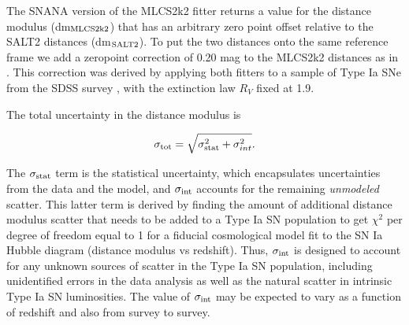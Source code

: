 The SNANA version of the MLCS2k2 fitter returns a value for the
distance modulus (dm$_{\rm MLCS2k2}$) that has an arbitrary zero point
offset relative to the SALT2 distances (dm$_{\rm SALT2}$).  To put the
two distances onto the same reference frame we add a zeropoint
correction of 0.20 mag to the MLCS2k2 distances as
in \citealt{Patel:2014}.  This correction was derived by applying both
fitters to a sample of Type Ia SNe from the SDSS
survey \citep{Holtzman:2008,Kessler:2009b}, with the extinction law
$R_V$ fixed at 1.9.

The total uncertainty in the distance modulus is  

\begin{equation} \label{eqn:sigmatot}
 \sigma_{\rm tot} = \sqrt{ \sigma_{\rm stat}^2 + \sigma_{int}^2}.
\end{equation}

\noindent
The $\sigma_{\rm stat}$ term is the statistical uncertainty, which
encapsulates uncertainties from the data and the model, and
$\sigma_{\rm int}$ accounts for the remaining {\it unmodeled} scatter.
This latter term is derived by finding the amount of additional
distance modulus scatter that needs to be added to a Type Ia SN
population to get $\chi^2$ per degree of freedom equal to 1 for a
fiducial cosmological model fit to the SN Ia Hubble diagram (distance
modulus vs redshift).  Thus, $\sigma_{\rm int}$ is designed to account
for any unknown sources of scatter in the Type Ia SN population,
including unidentified errors in the data analysis as well as the
natural scatter in intrinsic Type Ia SN luminosities.  The value of
$\sigma_{\rm int}$ may be expected to vary as a function of redshift
and also from survey to survey.

